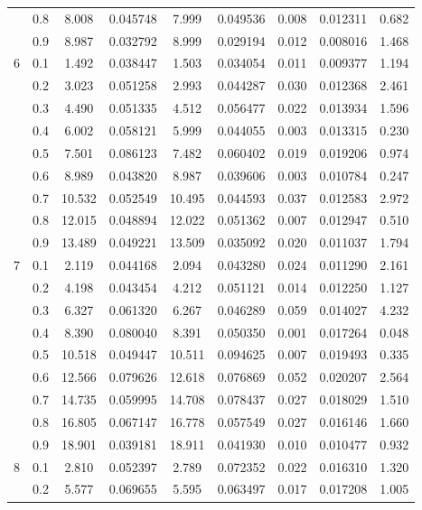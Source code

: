 \begin{longtable}{ | c | c || c | c | c | c | c | c | c | }
 & 0.8 & 8.008 & 0.045748 & 7.999 & 0.049536 & 0.008 & 0.012311 & 0.682 \\
 & 0.9 & 8.987 & 0.032792 & 8.999 & 0.029194 & 0.012 & 0.008016 & 1.468 \\
 \hline
\multirow{9}{*}{6} & 0.1 & 1.492 & 0.038447 & 1.503 & 0.034054 & 0.011 & 0.009377 & 1.194 \\
 & 0.2 & 3.023 & 0.051258 & 2.993 & 0.044287 & 0.030 & 0.012368 & 2.461 \\
 & 0.3 & 4.490 & 0.051335 & 4.512 & 0.056477 & 0.022 & 0.013934 & 1.596 \\
 & 0.4 & 6.002 & 0.058121 & 5.999 & 0.044055 & 0.003 & 0.013315 & 0.230 \\
 & 0.5 & 7.501 & 0.086123 & 7.482 & 0.060402 & 0.019 & 0.019206 & 0.974 \\
 & 0.6 & 8.989 & 0.043820 & 8.987 & 0.039606 & 0.003 & 0.010784 & 0.247 \\
 & 0.7 & 10.532 & 0.052549 & 10.495 & 0.044593 & 0.037 & 0.012583 & 2.972 \\
 & 0.8 & 12.015 & 0.048894 & 12.022 & 0.051362 & 0.007 & 0.012947 & 0.510 \\
 & 0.9 & 13.489 & 0.049221 & 13.509 & 0.035092 & 0.020 & 0.011037 & 1.794 \\
 \hline
\multirow{9}{*}{7} & 0.1 & 2.119 & 0.044168 & 2.094 & 0.043280 & 0.024 & 0.011290 & 2.161 \\
 & 0.2 & 4.198 & 0.043454 & 4.212 & 0.051121 & 0.014 & 0.012250 & 1.127 \\
 & 0.3 & 6.327 & 0.061320 & 6.267 & 0.046289 & 0.059 & 0.014027 & 4.232 \\
 & 0.4 & 8.390 & 0.080040 & 8.391 & 0.050350 & 0.001 & 0.017264 & 0.048 \\
 & 0.5 & 10.518 & 0.049447 & 10.511 & 0.094625 & 0.007 & 0.019493 & 0.335 \\
 & 0.6 & 12.566 & 0.079626 & 12.618 & 0.076869 & 0.052 & 0.020207 & 2.564 \\
 & 0.7 & 14.735 & 0.059995 & 14.708 & 0.078437 & 0.027 & 0.018029 & 1.510 \\
 & 0.8 & 16.805 & 0.067147 & 16.778 & 0.057549 & 0.027 & 0.016146 & 1.660 \\
 & 0.9 & 18.901 & 0.039181 & 18.911 & 0.041930 & 0.010 & 0.010477 & 0.932 \\
 \hline
\multirow{9}{*}{8} & 0.1 & 2.810 & 0.052397 & 2.789 & 0.072352 & 0.022 & 0.016310 & 1.320 \\
 & 0.2 & 5.577 & 0.069655 & 5.595 & 0.063497 & 0.017 & 0.017208 & 1.005 \\

\end{longtable}
